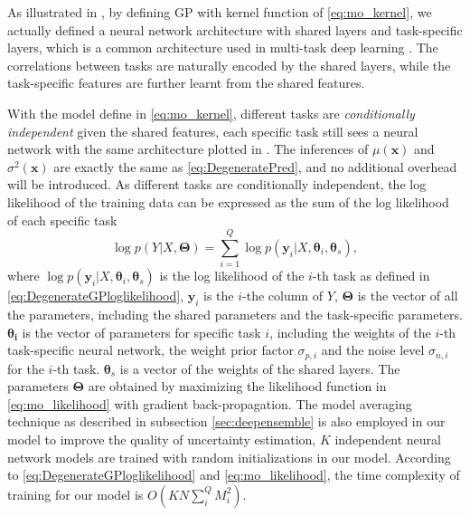 As illustrated in , by defining GP with kernel function of \eqref{eq:mo_kernel}, we actually defined a neural network architecture with shared layers and task-specific layers, which is a common architecture used in multi-task deep learning \cite{ruder2017overview}. The correlations between tasks are naturally encoded by the shared layers, while the task-specific features are further learnt from the shared features.

With the model define in \eqref{eq:mo_kernel}, different tasks are \emph{conditionally independent} given the shared features, each specific task still sees a neural network with the same architecture plotted in . The inferences of $\mu(\bm{x})$ and $\sigma^2(\bm{x})$ are exactly the same as \eqref{eq:DegeneratePred}, and no additional overhead will be introduced. As different tasks are conditionally independent, the log likelihood of the training data can be expressed as the sum of the log likelihood of each specific task
\begin{equation}
    \label{eq:mo_likelihood}
    \log p(Y | X, \bm{\Theta}) = \sum_{i=1}^Q \log p(\bm{y}_i | X, \bm{\theta}_i, \bm{\theta}_s),
\end{equation}
where $\log p(\bm{y}_i | X, \bm{\theta}_i, \bm{\theta}_s)$ is the log likelihood of the $i$-th task as defined in \eqref{eq:DegenerateGPloglikelihood}, $\bm{y}_i$ is the $i$-the column of $Y$, $\bm{\Theta}$ is the vector of all the parameters, including the shared parameters and the task-specific parameters. $\bm{\theta_i}$ is the vector of parameters for specific task $i$, including the weights of the $i$-th task-specific neural network, the weight prior factor $\sigma_{p, i}$ and the noise level $\sigma_{n, i}$ for the $i$-th task. $\bm{\theta}_s$ is a vector of the weights of the shared layers. The parameters $\bm{\Theta}$ are obtained by maximizing the likelihood function in \eqref{eq:mo_likelihood} with gradient back-propagation. The model averaging technique as described in subsection \ref{sec:deepensemble} is also employed in our model to improve the quality of uncertainty estimation, $K$ independent neural network models are trained with random initializations in our model. According to \eqref{eq:DegenerateGPloglikelihood} and \eqref{eq:mo_likelihood}, the time complexity of training for our model is $O(KN\sum_i^Q M_i^2)$.
